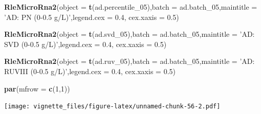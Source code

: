 \documentclass[]{book}
\newenvironment{Shaded}{\begin{snugshade}}{\end{snugshade}}
\newcommand{\KeywordTok}[1]{\textcolor[rgb]{0.13,0.29,0.53}{\textbf{#1}}}
\newcommand{\DataTypeTok}[1]{\textcolor[rgb]{0.13,0.29,0.53}{#1}}
\newcommand{\DecValTok}[1]{\textcolor[rgb]{0.00,0.00,0.81}{#1}}
\newcommand{\FloatTok}[1]{\textcolor[rgb]{0.00,0.00,0.81}{#1}}
\newcommand{\StringTok}[1]{\textcolor[rgb]{0.31,0.60,0.02}{#1}}
\newcommand{\NormalTok}[1]{#1}
\begin{document}
\begin{Shaded}
\begin{Highlighting}[]
\KeywordTok{RleMicroRna2}\NormalTok{(}\DataTypeTok{object =} \KeywordTok{t}\NormalTok{(ad.percentile_}\DecValTok{05}\NormalTok{),}\DataTypeTok{batch =}\NormalTok{ ad.batch_}\DecValTok{05}\NormalTok{,}\DataTypeTok{maintitle =} \StringTok{'AD: PN (0-0.5 g/L)'}\NormalTok{,}\DataTypeTok{legend.cex =} \FloatTok{0.4}\NormalTok{, }\DataTypeTok{cex.xaxis =} \FloatTok{0.5}\NormalTok{)}

\KeywordTok{RleMicroRna2}\NormalTok{(}\DataTypeTok{object =} \KeywordTok{t}\NormalTok{(ad.svd_}\DecValTok{05}\NormalTok{),}\DataTypeTok{batch =}\NormalTok{ ad.batch_}\DecValTok{05}\NormalTok{,}\DataTypeTok{maintitle =} \StringTok{'AD: SVD (0-0.5 g/L)'}\NormalTok{,}\DataTypeTok{legend.cex =} \FloatTok{0.4}\NormalTok{, }\DataTypeTok{cex.xaxis =} \FloatTok{0.5}\NormalTok{)}

\KeywordTok{RleMicroRna2}\NormalTok{(}\DataTypeTok{object =} \KeywordTok{t}\NormalTok{(ad.ruv_}\DecValTok{05}\NormalTok{),}\DataTypeTok{batch =}\NormalTok{ ad.batch_}\DecValTok{05}\NormalTok{,}\DataTypeTok{maintitle =} \StringTok{'AD: RUVIII (0-0.5 g/L)'}\NormalTok{,}\DataTypeTok{legend.cex =} \FloatTok{0.4}\NormalTok{, }\DataTypeTok{cex.xaxis =} \FloatTok{0.5}\NormalTok{)}

\KeywordTok{par}\NormalTok{(}\DataTypeTok{mfrow =} \KeywordTok{c}\NormalTok{(}\DecValTok{1}\NormalTok{,}\DecValTok{1}\NormalTok{))}
\end{Highlighting}
\end{Shaded}

\texttt{[image: vignette\_files/figure-latex/unnamed-chunk-56-2.pdf]}
\end{document}
